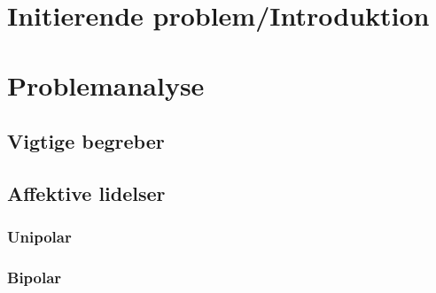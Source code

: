 %
%
%
%
% 


\pagestyle{empty} %
%
%

\cleardoublepage
{}
\pagestyle{fancy} %
\tableofcontents
\listoftodos
%
\cleardoublepage
\chapter{Initierende problem/Introduktion}
\chapter{Problemanalyse}
\section{Vigtige begreber}

\section{Affektive lidelser}


\subsection{Unipolar}
\subsection{Bipolar}

